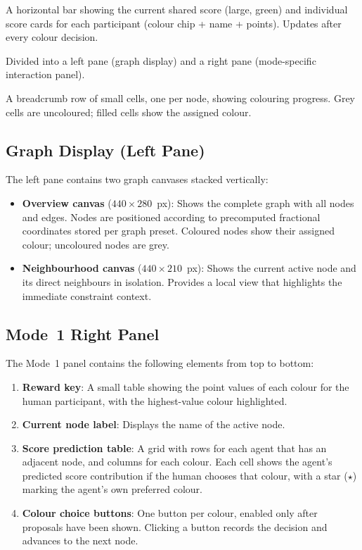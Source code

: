 \documentclass[11pt]{article}
\theoremstyle{definition}
\begin{document}
\begin{description}[leftmargin=2em, itemsep=2pt]
  \item[Top — Scoring HUD]  A horizontal bar showing the current shared score (large,
    green) and individual score cards for each participant (colour chip + name + points).
    Updates after every colour decision.
  \item[Middle — Main Panel]  Divided into a left pane (graph display) and a right
    pane (mode-specific interaction panel).
  \item[Bottom — Sequence Bar]  A breadcrumb row of small cells, one per node,
    showing colouring progress.  Grey cells are uncoloured; filled cells show the
    assigned colour.
\end{description}

\subsection{Graph Display (Left Pane)}

The left pane contains two graph canvases stacked vertically:

\begin{itemize}[nosep]
  \item \textbf{Overview canvas} ($440 \times 280$~px): Shows the complete graph with
    all nodes and edges.  Nodes are positioned according to precomputed fractional
    coordinates stored per graph preset.  Coloured nodes show their assigned colour;
    uncoloured nodes are grey.
  \item \textbf{Neighbourhood canvas} ($440 \times 210$~px): Shows the current active
    node and its direct neighbours in isolation.  Provides a local view that highlights
    the immediate constraint context.
\end{itemize}

\subsection{Mode~1 Right Panel}

The Mode~1 panel contains the following elements from top to bottom:

\begin{enumerate}[nosep]
  \item \textbf{Reward key}: A small table showing the point values of each colour for
    the human participant, with the highest-value colour highlighted.
  \item \textbf{Current node label}: Displays the name of the active node.
  \item \textbf{Score prediction table}: A grid with rows for each agent that has an
    adjacent node, and columns for each colour.  Each cell shows the agent's predicted
    score contribution if the human chooses that colour, with a star ($\star$) marking
    the agent's own preferred colour.
  \item \textbf{Colour choice buttons}: One button per colour, enabled only after
    proposals have been shown.  Clicking a button records the decision and advances to
    the next node.
\end{enumerate}
\end{document}
